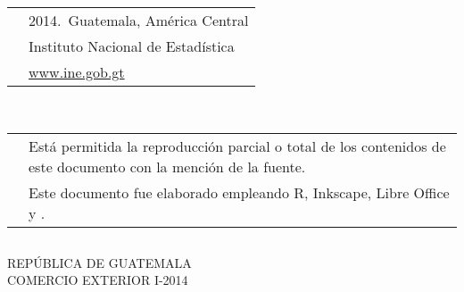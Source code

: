 $\ $
\vspace{4.5cm}

\noindent\begin{tabular}{p{0.1cm}p{6.8cm}}
	& 2014.$\,$ Guatemala, América Central \\
	&\Bold Instituto Nacional de Estadística\\[-0.4cm]
	&\color{blue!50!black}\url{www.ine.gob.gt}\\[0.9cm]
\end{tabular}\\
\noindent\begin{tabular}{p{0.1cm}p{6.8cm}}
	& Está permitida la reproducción parcial o total de los contenidos de este documento con la mención de la fuente. \\[0.5cm]
	
	& Este documento fue elaborado empleando  {\Sans R}, Inkscape, Libre Office y {\Logos \XeLaTeX}.\\
\end{tabular} 


\clearpage




$\ $
\vspace{3.5cm}

\begin{center}
	\Bold \LARGE REPÚBLICA DE GUATEMALA\\
	COMERCIO EXTERIOR I-2014\
\end{center}
\cleardoublepage

